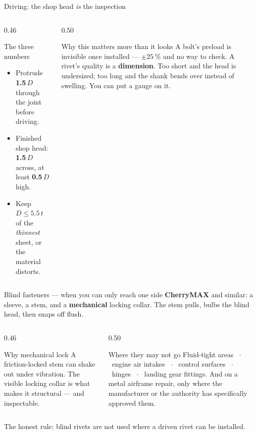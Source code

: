 \documentclass[aspectratio=169,10pt]{beamer}
\begin{document}
\begin{frame}{Driving: the shop head \emph{is} the inspection}
\begin{columns}[T]
\begin{column}{0.46\textwidth}
\begin{block}{The three numbers}
\begin{itemize}\footnotesize
\item Protrude \textbf{1.5\,$D$} through the joint before driving.
\item Finished shop head: \textbf{1.5\,$D$} across, at least \textbf{0.5\,$D$} high.
\item Keep $D \le 5.5\,t$ of the \emph{thinnest} sheet, or the material distorts.
\end{itemize}
\end{block}
\end{column}
\begin{column}{0.50\textwidth}
\begin{alertblock}{Why this matters more than it looks}
A bolt's preload is invisible once installed --- $\pm\SI{25}{\percent}$ and no way to check.
\vspace{3pt}
A rivet's quality is a \textbf{dimension}. Too short and the head is undersized; too long and the
shank bends over instead of swelling.
\vspace{3pt}
\alert{You can put a gauge on it.}
\end{alertblock}
\end{column}
\end{columns}
\end{frame}

\begin{frame}{Blind fasteners --- when you can only reach one side}
\textbf{CherryMAX} and similar: a sleeve, a stem, and a \textbf{mechanical} locking collar. The stem
pulls, bulbs the blind head, then snaps off flush.
\vfill
\begin{columns}[T]
\begin{column}{0.46\textwidth}
\begin{block}{Why mechanical lock}
A friction-locked stem can shake out under vibration. The visible locking collar is what makes it
structural --- and inspectable.
\end{block}
\end{column}
\begin{column}{0.50\textwidth}
\begin{alertblock}{Where they may not go}
Fluid-tight areas \ $\cdot$ \ engine air intakes \ $\cdot$ \ control surfaces \ $\cdot$ \ hinges \
$\cdot$ \ landing gear fittings.
\vspace{2pt}
{\footnotesize And on a metal airframe repair, only where the manufacturer or the authority has
specifically approved them.}
\end{alertblock}
\end{column}
\end{columns}
\vfill
\centering
The honest rule: \alert{blind rivets are not used where a driven rivet can be installed.}
\end{frame}
\end{document}
